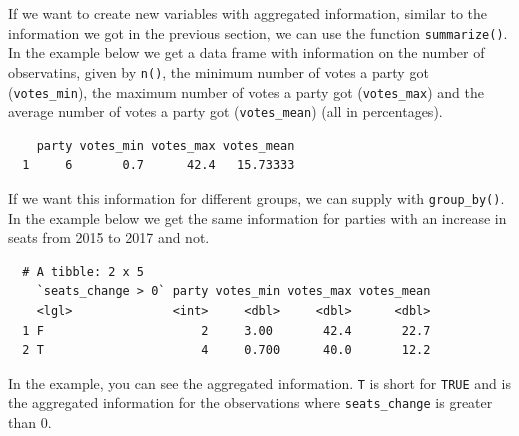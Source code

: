 \documentclass[12pt,oneside]{reedthesis}
\theoremstyle{definition}
\theoremstyle{definition}
\theoremstyle{definition}
\theoremstyle{remark}
\begin{document}
  If we want to create new variables with aggregated information, similar
  to the information we got in the previous section, we can use the
  function \texttt{summarize()}. In the example below we get a data frame
  with information on the number of observatins, given by \texttt{n()},
  the minimum number of votes a party got (\texttt{votes\_min}), the
  maximum number of votes a party got (\texttt{votes\_max}) and the
  average number of votes a party got (\texttt{votes\_mean}) (all in
  percentages).
  \begin{Shaded}
  \end{Shaded}
  \begin{verbatim}
    party votes_min votes_max votes_mean
  1     6       0.7      42.4   15.73333
  \end{verbatim}
  If we want this information for different groups, we can supply with
  \texttt{group\_by()}. In the example below we get the same information
  for parties with an increase in seats from 2015 to 2017 and not.
  \begin{Shaded}
  \end{Shaded}
  \begin{verbatim}
  # A tibble: 2 x 5
    `seats_change > 0` party votes_min votes_max votes_mean
    <lgl>              <int>     <dbl>     <dbl>      <dbl>
  1 F                      2     3.00       42.4       22.7
  2 T                      4     0.700      40.0       12.2
  \end{verbatim}
  In the example, you can see the aggregated information. \texttt{T} is
  short for \texttt{TRUE} and is the aggregated information for the
  observations where \texttt{seats\_change} is greater than 0.
  
\end{document}
